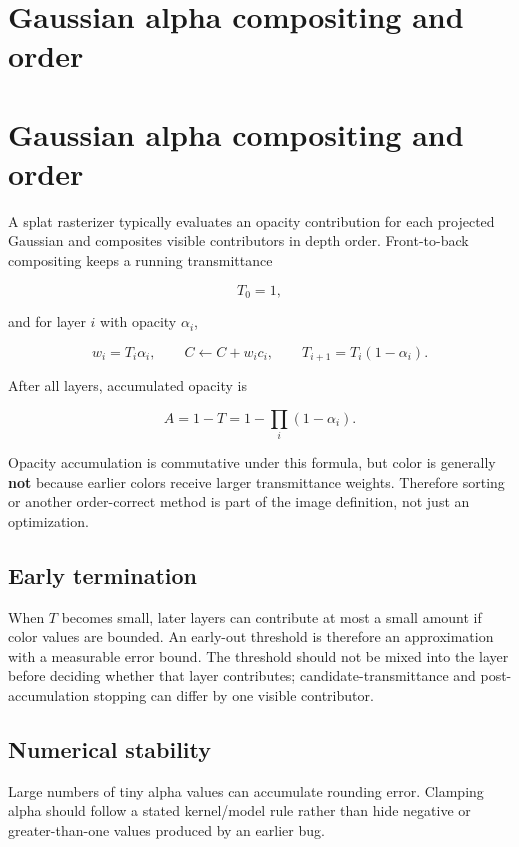 \hypertarget{appendix-5f4b2e24c3f6}{}
\section*{Gaussian alpha compositing and order}
\section{Gaussian alpha compositing and order}\label{gaussian-alpha-compositing-and-order}

A splat rasterizer typically evaluates an opacity contribution for each projected Gaussian and composites visible contributors in depth order. Front-to-back compositing keeps a running transmittance

\[
T_0=1,
\]

and for layer \(i\) with opacity \(\alpha_i\),

\[
w_i=T_i\alpha_i,
\qquad
C \leftarrow C+w_i c_i,
\qquad
T_{i+1}=T_i(1-\alpha_i).
\]

After all layers, accumulated opacity is

\[
A=1-T
=
1-\prod_i(1-\alpha_i).
\]

Opacity accumulation is commutative under this formula, but color is generally \textbf{not} because earlier colors receive larger transmittance weights. Therefore sorting or another order-correct method is part of the image definition, not just an optimization.

\subsection{Early termination}\label{early-termination}

When \(T\) becomes small, later layers can contribute at most a small amount if color values are bounded. An early-out threshold is therefore an approximation with a measurable error bound. The threshold should not be mixed into the layer before deciding whether that layer contributes; candidate-transmittance and post-accumulation stopping can differ by one visible contributor.

\subsection{Numerical stability}\label{numerical-stability}

Large numbers of tiny alpha values can accumulate rounding error. Clamping alpha should follow a stated kernel/model rule rather than hide negative or greater-than-one values produced by an earlier bug.

